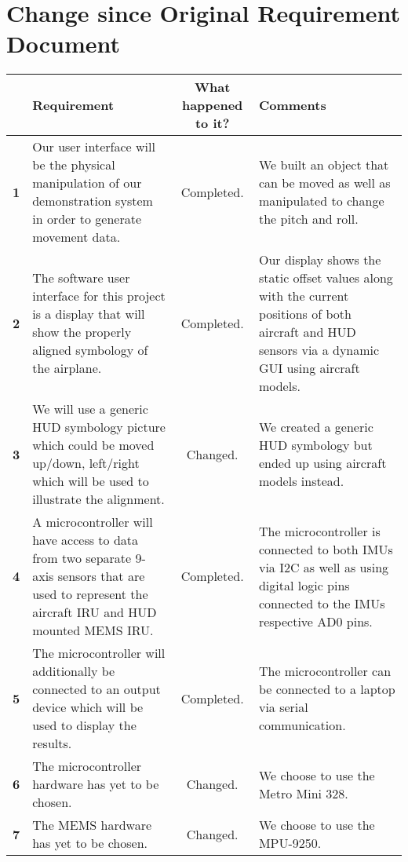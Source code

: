 \newpage
\section{Change since Original Requirement Document}
\hfill \break
\begin{center}
\begin{tabular}{|c|p{5cm}|c|p{5cm}|}
\hline
\textbf{} & \textbf{Requirement} & \textbf{What happened to it?} & \textbf{Comments} \\ \hline
\textbf{1}
& Our user interface will be the physical manipulation of our demonstration system in order to generate movement data.
& Completed.
& We built an object that can be moved as well as manipulated to change the pitch and roll.
\\ \hline
 
\textbf{2}
& The software user interface for this project is a display that will show the properly aligned symbology of the airplane.
& Completed.
& Our display shows the static offset values along with the current positions of both aircraft and HUD sensors via a dynamic GUI using aircraft models.
\\ \hline
 
\textbf{3}
& We will use a generic HUD symbology picture which could be moved up/down, left/right which will be used to illustrate the alignment.
& Changed.
& We created a generic HUD symbology but ended up using aircraft models instead.
\\ \hline
 
\textbf{4}
& A microcontroller will have access to data from two separate 9-axis sensors that are used to represent the aircraft IRU and HUD mounted MEMS IRU.
& Completed.
& The microcontroller is connected to both IMUs via I2C as well as using digital logic pins connected to the IMUs respective AD0 pins.
\\ \hline
 
\textbf{5}
& The microcontroller will additionally be connected to an output device which will be used to display the results.
& Completed.
& The microcontroller can be connected to a laptop via serial communication.
\\ \hline
 
\textbf{6}
& The microcontroller hardware has yet to be chosen.
& Changed.
& We choose to use the Metro Mini 328.
\\ \hline
 
\textbf{7}
& The MEMS hardware has yet to be chosen.
& Changed.
& We choose to use the MPU-9250.
\\ \hline
 

\end{tabular}
\end{center}
